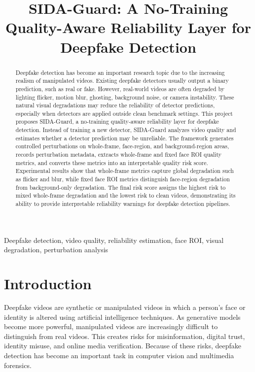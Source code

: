 \documentclass[conference]{IEEEtran}
\title{SIDA-Guard: A No-Training Quality-Aware Reliability Layer for Deepfake Detection}
\author{\IEEEauthorblockN{Team Name / Author Names}
\IEEEauthorblockA{Department / University\\
Email: your.email@example.com}}
\begin{document}
\maketitle

\begin{abstract}
Deepfake detection has become an important research topic due to the increasing realism of manipulated videos. Existing deepfake detectors usually output a binary prediction, such as real or fake. However, real-world videos are often degraded by lighting flicker, motion blur, ghosting, background noise, or camera instability. These natural visual degradations may reduce the reliability of detector predictions, especially when detectors are applied outside clean benchmark settings. This project proposes SIDA-Guard, a no-training quality-aware reliability layer for deepfake detection. Instead of training a new detector, SIDA-Guard analyzes video quality and estimates whether a detector prediction may be unreliable. The framework generates controlled perturbations on whole-frame, face-region, and background-region areas, records perturbation metadata, extracts whole-frame and fixed face ROI quality metrics, and converts these metrics into an interpretable quality risk score. Experimental results show that whole-frame metrics capture global degradation such as flicker and blur, while fixed face ROI metrics distinguish face-region degradation from background-only degradation. The final risk score assigns the highest risk to mixed whole-frame degradation and the lowest risk to clean videos, demonstrating its ability to provide interpretable reliability warnings for deepfake detection pipelines.
\end{abstract}

\begin{IEEEkeywords}
Deepfake detection, video quality, reliability estimation, face ROI, visual degradation, perturbation analysis
\end{IEEEkeywords}

\section{Introduction}
Deepfake videos are synthetic or manipulated videos in which a person's face or identity is altered using artificial intelligence techniques. As generative models become more powerful, manipulated videos are increasingly difficult to distinguish from real videos. This creates risks for misinformation, digital trust, identity misuse, and online media verification. Because of these risks, deepfake detection has become an important task in computer vision and multimedia forensics.
\end{document}
